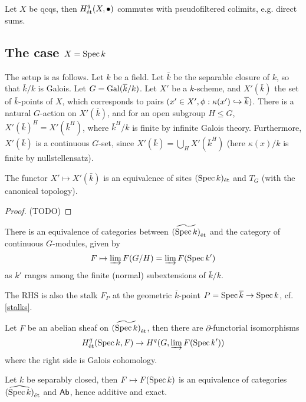 \documentclass[11pt]{amsart}
\begin{document}
\begin{cor}
    Let $X$ be qcqs, then $H^q_{\operatorname{\acute{e}t}}(X,\bullet)$ commutes with pseudofiltered colimits, e.g. direct sums.
\end{cor}


\subsection{The case $X=\operatorname{Spec} k$}

The setup is as follows. Let $k$ be a field. Let $\bar{k}$ be the separable closure of $k$, so that $\bar{k}/k$ is Galois. Let $G = \operatorname{Gal}(\overline{k}/k)$. Let $X'$ be a $k$-scheme, and $X'(\bar{k})$ the set of $\bar{k}$-points of $X$, which corresponds to pairs $(x'\in X', \phi: \kappa(x')\hookrightarrow \overline{k})$. There is a natural $G$-action on $X'(\bar{k})$, and for an open subgroup $H\le G$, $X'(\bar{k})^H = X'(\bar{k}^H)$, where $\bar{k}^H/k$ is finite by infinite Galois theory. Furthermore, $X'(\bar{k})$ is a continuous $G$-set, since $X'(\bar{k}) = \bigcup_{H} X'(\bar{k}^H)$ (here $\kappa(x)/k$ is finite by nullstellensatz).


\begin{thm}
    The functor $X'\mapsto X'(\bar{k})$ is an equivalence of sites $(\operatorname{Spec} k)_{\operatorname{\acute{e}t}}$ and $T_G$ (with the canonical topology).
\end{thm}

\begin{proof}
    (TODO)
\end{proof}

\begin{cor}
\label{specket_equiv}
    There is an equivalence of categories between $\widetilde{(\operatorname{Spec} k)}_{\operatorname{\acute{e}t}}$ and the category of continuous $G$-modules, given by
    \[F\mapsto \varinjlim F(G/H) = \varinjlim F(\operatorname{Spec} k')\]
    as $k'$ ranges among the finite (normal) subextensions of $\bar{k}/k$.
\end{cor}

The RHS is also the stalk $F_P$ at the geometric $\bar{k}$-point $P = \operatorname{Spec} \overline{k}\to \operatorname{Spec} k$, cf. \ref{stalks}. 

\begin{cor}
    Let $F$ be an abelian sheaf on $\widetilde{(\operatorname{Spec} k)}_{\operatorname{\acute{e}t}}$, then there are $\partial$-functorial isomorphisms
    \[H^q_{\operatorname{\acute{e}t}}(\operatorname{Spec} k, F) \to H^q(G, \varinjlim F(\operatorname{Spec} k'))\]
    where the right side is Galois cohomology.
\end{cor}


\begin{cor}
\label{section_exact}
    Let $k$ be separably closed, then $F\mapsto F(\operatorname{Spec} k)$ is an equivalence of categories $\widehat{(\operatorname{Spec} k)}_{\operatorname{\acute{e}t}}$ and $\mathsf{Ab}$, hence additive and exact.
\end{cor}
\end{document}
